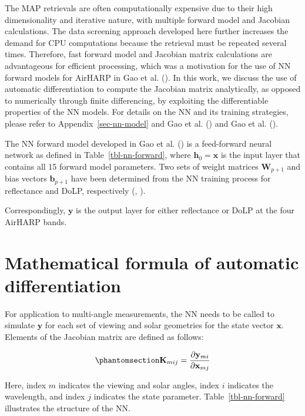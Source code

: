 \documentclass[
  11pt,
  letterpaper,
]{scrreprt}
\begin{document}
The MAP retrievals are often computationally expensive due to their high
dimensionality and iterative nature, with multiple forward model and
Jacobian calculations. The data screening approach developed here
further increases the demand for CPU computations because the retrieval
must be repeated several times. Therefore, fast forward model and
Jacobian matrix calculations are advantageous for efficient processing,
which was a motivation for the use of NN forward models for AirHARP in
Gao et al. (). In this work, we discuss
the use of automatic differentiation to compute the Jacobian matrix
analytically, as opposed to numerically through finite differencing, by
exploiting the differentiable properties of the NN models. For details
on the NN and its training strategies, please refer to
Appendix~\ref{sec-nn-model} and Gao et al.
() and Gao et al.
().

The NN forward model developed in Gao et al.
() is a feed-forward neural network as
defined in Table~\ref{tbl-nn-forward}, where \(\mathbf{h}_0=\mathbf{x}\)
is the input layer that contains all 15 forward model parameters. Two
sets of weight matrices \(\mathbf{W}_{p+1}\) and bias vectors
\(\mathbf{b}_{p+1}\) have been determined from the NN training process
for reflectance and DoLP, respectively (, ).

Correspondingly, \(\mathbf{y}\) is the output layer for either
reflectance or DoLP at the four AirHARP bands.

\section{Mathematical formula of automatic
differentiation}\label{mathematical-formula-of-automatic-differentiation}

For application to multi-angle measurements, the NN needs to be called
to simulate \(\mathbf{y}\) for each set of viewing and solar geometries
for the state vector \(\mathbf{x}\). Elements of the Jacobian matrix are
defined as follows:

\begin{equation}\phantomsection\label{eq-jacobian}{
\mathbf{K}_{mij}
=
\frac{\partial \mathbf{y}_{mi}}
{\partial \mathbf{x}_{mj}}
}\end{equation}

Here, index \(m\) indicates the viewing and solar angles, index \(i\)
indicates the wavelength, and index \(j\) indicates the state parameter.
Table~\ref{tbl-nn-forward} illustrates the structure of the NN.
\end{document}
